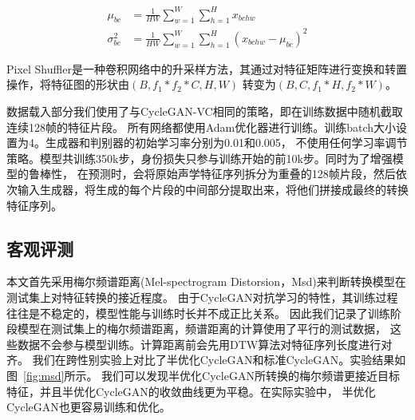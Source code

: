 \begin{align}
    \mu_{bc} & = \frac{1}{HW}\sum^W_{w=1}\sum^H_{h=1}x_{bchw} \\
    \sigma^2_{bc} & = \frac{1}{HW}\sum^W_{w=1}\sum^H_{h=1}(x_{bchw}-\mu_{bc})^2
\end{align}

Pixel Shuffler是一种卷积网络中的升采样方法，其通过对特征矩阵进行变换和转置操作，将特征图的形状由$(B,f_1 * f_2 * C,H,W)$
转变为$(B,C,f_1 *H,f_2 *W)$。

数据载入部分我们使用了与CycleGAN-VC相同的策略，即在训练数据中随机截取连续128帧的特征片段。
所有网络都使用Adam优化器进行训练。训练batch大小设置为4。生成器和判别器的初始学习率分别为0.01和0.005，
不使用任何学习率调节策略。模型共训练350k步，身份损失只参与训练开始的前10k步。同时为了增强模型的鲁棒性，
在预测时，会将原始声学特征序列拆分为重叠的128帧片段，然后依次输入生成器，将生成的每个片段的中间部分提取出来，将他们拼接成最终的转换特征序列。

\subsection{客观评测}
本文首先采用梅尔频谱距离(Mel-spectrogram Distorsion，Msd)来判断转换模型在测试集上对特征转换的接近程度。
由于CycleGAN对抗学习的特性，其训练过程往往是不稳定的，模型性能与训练时长并不成正比关系。
因此我们记录了训练阶段模型在测试集上的梅尔频谱距离，频谱距离的计算使用了平行的测试数据，
这些数据不会参与模型训练。计算距离前会先用DTW算法对特征序列长度进行对齐。
我们在跨性别实验上对比了半优化CycleGAN和标准CycleGAN。实验结果如图~\ref{fig:msd}所示。
我们可以发现半优化CycleGAN所转换的梅尔频谱更接近目标特征，并且半优化CycleGAN的收敛曲线更为平稳。在实际实验中，
半优化CycleGAN也更容易训练和优化。


